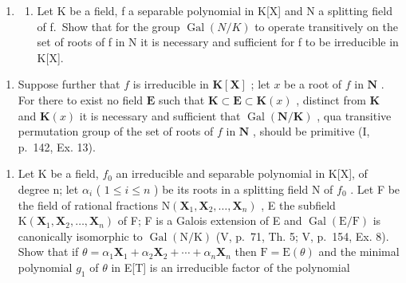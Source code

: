 \BourbakiExerciseGroup

\begin{enumerate}
\def\labelenumi{\arabic{enumi})}
\tightlist
\item
  \begin{enumerate}
  \def\labelenumii{\alph{enumii})}
  \tightlist
  \item
    Let K be a field, f a separable polynomial in K{[}X{]} and N a splitting field of f.~Show that for the group \(\operatorname{Gal}(N/K)\) to operate transitively on the set of roots of f in N it is necessary and sufficient for f to be irreducible in K{[}X{]}.
  \end{enumerate}
\end{enumerate}

\begin{enumerate}
\def\labelenumi{\alph{enumi})}
\setcounter{enumi}{1}
\tightlist
\item
  Suppose further that \(f\) is irreducible in \(\mathbf{K}[\mathbf{X}]\) ; let \(x\) be a root of \(f\) in \(\mathbf{N}\) . For there to exist no field \(\mathbf{E}\) such that \(\mathbf{K} \subset \mathbf{E} \subset \mathbf{K}(x)\) , distinct from \(\mathbf{K}\) and \(\mathbf{K}(x)\) it is necessary and sufficient that \(\operatorname{Gal}(\mathbf{N} / \mathbf{K})\) , qua transitive permutation group of the set of roots of \(f\) in \(\mathbf{N}\) , should be primitive (I, p.~142, Ex. 13).
\end{enumerate}

\begin{enumerate}
\def\labelenumi{\arabic{enumi})}
\setcounter{enumi}{1}
\tightlist
\item
  Let K be a field, \(f_{0}\) an irreducible and separable polynomial in K{[}X{]}, of degree n; let \(\alpha_{i}\) ( \(1 \leqslant i \leqslant n\) ) be its roots in a splitting field N of \(f_{0}\) . Let F be the field of rational fractions \(\mathrm{N}(\mathbf{X}_{1}, \mathbf{X}_{2}, \ldots, \mathbf{X}_{n})\) , E the subfield \(\mathrm{K}(\mathbf{X}_{1}, \mathbf{X}_{2}, \ldots, \mathbf{X}_{n})\) of F; F is a Galois extension of E and \(\operatorname{Gal}(\mathrm{E}/\mathrm{F})\) is canonically isomorphic to \(\operatorname{Gal}(\mathrm{N}/\mathrm{K})\) (V, p.~71, Th. 5; V, p.~154, Ex. 8). Show that if \(\theta = \alpha_{1}\mathbf{X}_{1} + \alpha_{2}\mathbf{X}_{2} + \cdots + \alpha_{n}\mathbf{X}_{n}\) then \(\mathrm{F} = \mathrm{E}(\theta)\) and the minimal polynomial \(g_{1}\) of \(\theta\) in E{[}T{]} is an irreducible factor of the polynomial
\end{enumerate}

